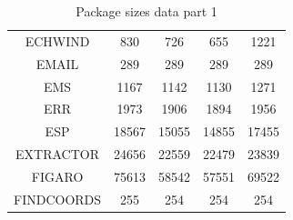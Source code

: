 \documentclass[twoside,11pt]{article}
\renewcommand{\_}{\texttt{\symbol{95}}}
\begin{document}
\begin{table}[ht]
\begin{center}
\begin{tabular}{|c|c|c|c|c|}
ECHWIND & 830 & 726 & 655 & 1221 \\ 
EMAIL & 289 & 289 & 289 & 289 \\ 
EMS & 1167 & 1142 & 1130 & 1271 \\ 
ERR & 1973 & 1906 & 1894 & 1956 \\ 
ESP & 18567 & 15055 & 14855 & 17455 \\ 
EXTRACTOR & 24656 & 22559 & 22479 & 23839 \\ 
FIGARO & 75613 & 58542 & 57551 & 69522 \\ 
FINDCOORDS & 255 & 254 & 254 & 254 \\ 
\hline
\end{tabular}
\caption{Package sizes data part 1}
\end{center}
\end{table}
\end{document}

